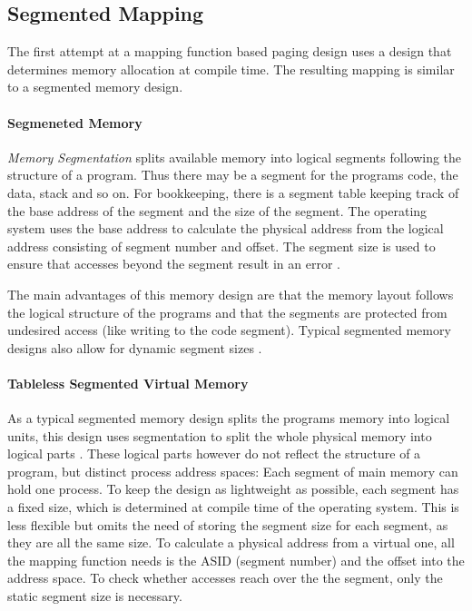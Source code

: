 \subsection{Segmented Mapping}

The first attempt at a mapping function based paging design
uses a design that determines memory allocation at compile time.
The resulting mapping is similar to a segmented memory design.

\paragraph{Segmeneted Memory}
\textit{Memory Segmentation} splits available memory into logical segments following the structure of a program. Thus there may be a segment for the programs code, the data, stack and so on.
For bookkeeping, there is a segment table keeping track of the base address of the segment
and the size of the segment.
The operating system uses the base address to calculate the physical address from the logical
address consisting of segment number and offset. The segment size is used to ensure that
accesses beyond the segment result in an error \cite{tanenbaumOS}.

The main advantages of this memory design are that the memory layout follows the logical structure of the programs and that the segments are protected from undesired access (like writing to the code segment).
Typical segmented memory designs also allow for dynamic segment sizes \cite{tanenbaumOS}.



\paragraph{Tableless Segmented Virtual Memory}
As a typical segmented memory design splits the programs memory into logical units, this design uses segmentation to split the whole physical memory into logical parts \cite{tanenbaumOS}.
These logical parts however do not reflect the structure of a program, but distinct process address spaces: Each segment of main memory can hold one process.
To keep the design as lightweight as possible, each segment has a fixed size, which is determined at compile time of the operating system.
This is less flexible but omits the need of storing the segment size for each segment, as they are all the same size.
To calculate a physical address from a virtual one, all the mapping function needs is the ASID (segment number) and the offset into the address space.
To check whether accesses reach over the the segment, only the static segment size is necessary.

